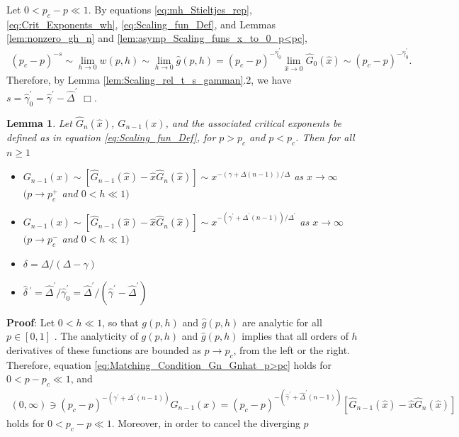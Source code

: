 \documentclass[jmp,graphicx]{revtex4-1}
\newtheorem{lemma}{Lemma}[section]
\newcommand{\gh}{\hat{\gamma}}
\newcommand{\Dh}{\hat{\Delta}}
\newcommand{\dha}{\hat{\delta}}
\newcommand{\xh}{\hat{x}}
\begin{document}
Let $0<p_c-p\ll1$. By equations \eqref{eq:mh_Stieltjes_rep},
\eqref{eq:Crit_Exponents_wh}, \eqref{eq:Scaling_fun_Def}, and Lemmas
\ref{lem:nonzero_gh_n} and \ref{lem:asymp_Scaling_funs_x_to_0_p<pc},
%
\begin{align*}
  (p_c-p)^{-s}\sim\lim_{h\to0}w(p,h)
           \sim\lim_{h\to0}\hat{g}(p,h)
           =(p_c-p)^{-\gh_0^\prime}\lim_{\xh\to0}\hat{G}_0(\xh)
           \sim(p_c-p)^{-\gh_0^\prime}. 
\end{align*}
%
Therefore, by Lemma \ref{lem:Scaling_rel_t_s_gamman}.2, we have
$s=\gh_0^\prime=\gh^\prime-\Dh^\prime$ $\Box$. 
%
 \begin{lemma}\label{lem:G_ghat_asymp_x_to_infty}
   Let $\hat{G}_n(\xh)$, $G_{n-1}(x)$, and the associated critical
   exponents be defined as in equation \eqref{eq:Scaling_fun_Def}, for
   $p>p_c$ and $p<p_c$. Then for all $n\geq1$ 
     \begin{itemize}
    \item[1)] $G_{n-1}(x)\sim[\hat{G}_{n-1}(\xh)-\xh\hat{G}_n(\xh)]\sim
      x^{-(\gamma+\Delta(n-1))/\Delta}$ as $x\to\infty$ $(p\to p_c^+$ and 
      $0<h\ll1)$
    \item[2)] $G_{n-1}(x)\sim[\hat{G}_{n-1}(\xh)-\xh\hat{G}_n(\xh)]\sim
      x^{-(\gamma^\prime+\Delta^\prime(n-1))/\Delta^\prime}$ as $x\to\infty$ $(p\to p_c^-$ and $0<h\ll1)$           
    \item[3)] $\delta=\Delta/(\Delta-\gamma)$
    \item[4)] $\dha\,^\prime=\Dh^\prime/\gh_0^\prime=\Dh^\prime/(\gh^\prime-\Dh^\prime)$  
     \end{itemize}
 \end{lemma}
%
\noindent \textbf{Proof}:
%
Let $0<h\ll1$, so that $g(p,h)$ and $\hat{g}(p,h)$ are analytic for
all $p\in[0,1]$ \cite{Golden:CMP-473}. The analyticity of $g(p,h)$ and
$\hat{g}(p,h)$ implies that all orders of $h$ derivatives of these
functions are bounded as $p\to p_c$, from the left or the
right. Therefore, equation \eqref{eq:Matching_Condition_Gn_Gnhat_p>pc}
holds for $0<p-p_c\ll1$, and 
%
\begin{align}\label{eq:x_infty_p<pc}
  (0,\infty)\ni(p_c-p)^{-(\gamma^\prime+\Delta^\prime(n-1))}G_{n-1}(x)
       =(p_c-p)^{-(\gh^\prime+\Dh^\prime(n-1))}[\hat{G}_{n-1}(\xh)-\xh\hat{G}_n(\xh)]
\end{align}
%
holds for $0<p_c-p\ll1$. Moreover, in order to cancel the diverging $p$
\end{document}
